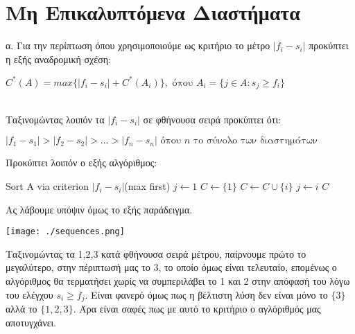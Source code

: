 \documentclass{article} \usepackage[greek,english]{babel}
\begin{document}
\pagebreak

\section{Μη Επικαλυπτόμενα Διαστήματα}
α. Για την περίπτωση όπου χρησιμοποιούμε ως κριτήριο το μέτρο $|f_i - s_i|$ προκύπτει η εξής αναδρομική
σχέση: \\
\begin{center}
$C^*(A) = max\{|f_i-s_i|+C^*(A_i)\}, \text{ όπου }  A_i=\{j\in A: s_j \ge f_i\}$
\end{center} \\

Ταξινομώντας λοιπόν τα $|f_i - s_i|$ σε φθήνουσα σειρά προκύπτει ότι: \\
\begin{center}
    $|f_1 - s_1| > |f_2 - s_2| > \dots > |f_n - s_n| \text{ όπου } n \text{ το σύνολο των διαστημάτων}$ \\
\end{center}

Προκύπτει λοιπόν ο εξής αλγόριθμος: \\

    \begin{algorithm}
        \caption{$Sequences\_1(S)$}
        \begin{algorithmic}[1]
        \State Sort A via criterion $|f_i - s_i|$(max first)
        \State $j \leftarrow 1$
        \State $C \leftarrow \{1\}$ 
                \State $C \leftarrow C \cup \{i\}$
                \State $j \leftarrow i$
            \EndIf
        \EndFor
        \Return $C$

        \end{algorithmic}
    \end{algorithm}

Ας λάβουμε υπόψιν όμως το εξής παράδειγμα.

\begin{center}
    \texttt{[image: ./sequences.png]}
\end{center}

Ταξινομώντας τα 1,2,3 κατά φθήνουσα σειρά μέτρου, παίρνουμε πρώτο το μεγαλύτερο, στην πέριπτωσή μας το
3, το οποίο όμως είναι τελευταίο, επομένως ο αλγόριθμος θα τερματήσει χωρίς να συμπεριλάβει το 1 και 2 
στην απόφασή του λόγω του ελέγχου $s_i \ge f_j$. Είναι φανερό όμως πως η βέλτιστη λύση δεν είναι μόνο το
$\{3\}$ αλλά το $\{1,2,3\}$. Άρα είναι σαφές πως με αυτό το κριτήριο ο αγλόριθμός μας αποτυγχάνει. \\
\end{document}
